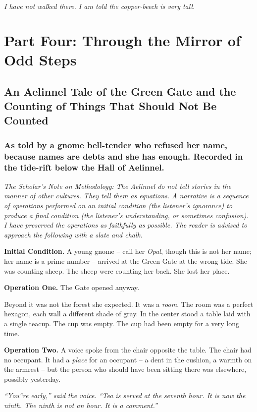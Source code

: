 \documentclass[12pt]{article}
\begin{document}
\textit{I have not walked there. I am told the copper-beech is very tall.}

\section{Part Four: Through the Mirror of Odd Steps}
\subsection{An Aelinnel Tale of the Green Gate and the Counting of Things That Should Not Be Counted}
\subsubsection{As told by a gnome bell-tender who refused her name, because names are debts and she has enough. Recorded in the tide-rift below the Hall of Aelinnel.}
\textit{The Scholar's Note on Methodology: The Aelinnel do not tell stories in the manner of other cultures. They tell them \textit{as equations}. A narrative is a sequence of operations performed on an initial condition (the listener's ignorance) to produce a final condition (the listener's understanding, or sometimes confusion). I have preserved the operations as faithfully as possible. The reader is advised to approach the following with a slate and chalk.}

\textbf{Initial Condition.} A young gnome -- call her \textit{Opal}, though this is not her name; her name is a prime number -- arrived at the Green Gate at the wrong tide. She was counting sheep. The sheep were counting her back. She lost her place.

\textbf{Operation One.} The Gate opened anyway.

Beyond it was not the forest she expected. It was a \textit{room}. The room was a perfect hexagon, each wall a different shade of gray. In the center stood a table laid with a single teacup. The cup was empty. The cup had been empty for a very long time.

\textbf{Operation Two.} A voice spoke from the chair opposite the table. The chair had no occupant. It had a \textit{place} for an occupant -- a dent in the cushion, a warmth on the armrest -- but the person who should have been sitting there was elsewhere, possibly yesterday.

\textit{``You``re early,'' said the voice. ``Tea is served at the seventh hour. It is now the ninth. The ninth is not an hour. It is a \textit{comment}.''}
\end{document}

